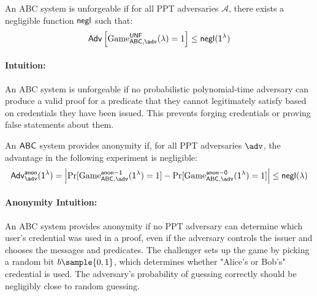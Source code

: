 \begin{definition}[Unforgeability]
An ABC system is unforgeable if for all PPT adversaries $\mathcal{A}$, there exists a negligible function $\mathsf{negl}$ such that:
\[
\mathsf{Adv}\left[\mathrm{Game}^{\mathsf{\UNF}}_{\ABC, \adv}(\lambda) = 1\right] \leq \negl(\secparam)
\]
\end{definition}

\paragraph{Intuition:} An ABC system is unforgeable if no probabilistic polynomial-time adversary can produce a valid proof for a predicate that they cannot legitimately satisfy based on credentials they have been issued. This prevents forging credentials or proving false statements about them.

\begin{definition}[Anonymity]
An $\mathsf{ABC}$ system provides anonymity if, for all PPT adversaries $\adv$, the advantage in the following experiment is negligible:
\[
\mathsf{Adv}^{\mathsf{anon}}_{\adv}(\secparam) = \left| \Pr[\mathrm{Game}^{\mathsf{anon-1}}_{\ABC, \adv}(\secparam) = 1] - \Pr[\mathrm{Game}^{\mathsf{anon-0}}_{\ABC, \adv}(\secparam) = 1] \right| \leq \negl(\lambda)
\]
\end{definition}


\paragraph{Anonymity Intuition:} An ABC system provides anonymity if no PPT adversary can determine which user's credential was used in a proof, even if the adversary controls the issuer and chooses the messages and predicates. The challenger sets up the game by picking a random bit $b \sample \{0,1\}$, which determines whether "Alice's or Bob's" credential is used. The adversary's probability of guessing correctly should be negligibly close to random guessing.















